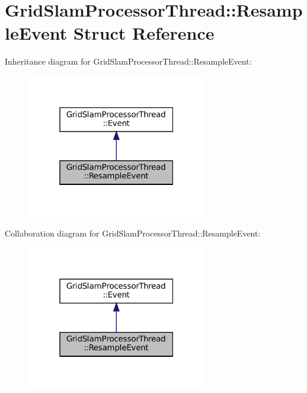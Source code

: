 \hypertarget{structGridSlamProcessorThread_1_1ResampleEvent}{}\section{Grid\+Slam\+Processor\+Thread\+:\+:Resample\+Event Struct Reference}
\label{structGridSlamProcessorThread_1_1ResampleEvent}


Inheritance diagram for Grid\+Slam\+Processor\+Thread\+:\+:Resample\+Event\+:
\nopagebreak
\begin{figure}[H]
\begin{center}
\leavevmode
\includegraphics[width=223pt]{structGridSlamProcessorThread_1_1ResampleEvent__inherit__graph}
\end{center}
\end{figure}


Collaboration diagram for Grid\+Slam\+Processor\+Thread\+:\+:Resample\+Event\+:
\nopagebreak
\begin{figure}[H]
\begin{center}
\leavevmode
\includegraphics[width=223pt]{structGridSlamProcessorThread_1_1ResampleEvent__coll__graph}
\end{center}
\end{figure}
